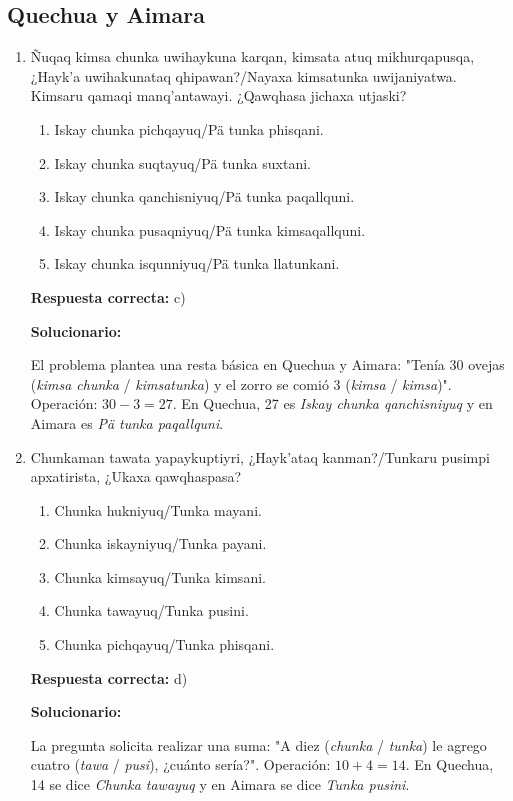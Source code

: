 \subsection*{Quechua y Aimara}

\begin{enumerate}[resume]
	
	\item Ñuqaq kimsa chunka uwihaykuna karqan, kimsata atuq mikhurqapusqa, ¿Hayk'a uwihakunataq qhipawan?/Nayaxa kimsatunka uwijaniyatwa. Kimsaru qamaqi manq'antawayi. ¿Qawqhasa jichaxa utjaski?
	
	\begin{enumerate}[label=\alph*)]
		\item Iskay chunka pichqayuq/Pä tunka phisqani.
		\item Iskay chunka suqtayuq/Pä tunka suxtani.
		\item Iskay chunka qanchisniyuq/Pä tunka paqallquni.
		\item Iskay chunka pusaqniyuq/Pä tunka kimsaqallquni.
		\item Iskay chunka isqunniyuq/Pä tunka llatunkani.
	\end{enumerate}
	
	\textbf{Respuesta correcta:} c)
	
	\vspace{2mm}
	\textbf{Solucionario:}
	
	El problema plantea una resta básica en Quechua y Aimara: "Tenía 30 ovejas (\textit{kimsa chunka} / \textit{kimsatunka}) y el zorro se comió 3 (\textit{kimsa} / \textit{kimsa})". 
	Operación: $30 - 3 = 27$.
	En Quechua, 27 es \textit{Iskay chunka qanchisniyuq} y en Aimara es \textit{Pä tunka paqallquni}.
	
	\vspace{6mm}
	
	\item Chunkaman tawata yapaykuptiyri, ¿Hayk'ataq kanman?/Tunkaru pusimpi apxatirista, ¿Ukaxa qawqhaspasa?
	
	\begin{enumerate}[label=\alph*)]
		\item Chunka hukniyuq/Tunka mayani.
		\item Chunka iskayniyuq/Tunka payani.
		\item Chunka kimsayuq/Tunka kimsani.
		\item Chunka tawayuq/Tunka pusini.
		\item Chunka pichqayuq/Tunka phisqani.
	\end{enumerate}
	
	\textbf{Respuesta correcta:} d)
	
	\vspace{2mm}
	\textbf{Solucionario:}
	
	La pregunta solicita realizar una suma: "A diez (\textit{chunka} / \textit{tunka}) le agrego cuatro (\textit{tawa} / \textit{pusi}), ¿cuánto sería?".
	Operación: $10 + 4 = 14$.
	En Quechua, 14 se dice \textit{Chunka tawayuq} y en Aimara se dice \textit{Tunka pusini}.
	
	\vspace{6mm}
	
\end{enumerate}

